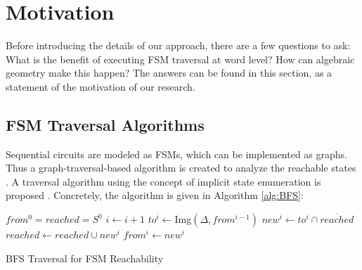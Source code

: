 \section{Motivation}
Before introducing the details of our approach, there are a few questions to ask: What is 
the benefit of executing FSM traversal at word level? How can algebraic geometry make this happen?
The answers can be found in this section, as a statement of the motivation of our research.

\subsection{FSM Traversal Algorithms}
Sequential circuits are modeled as FSMs, which can be implemented as graphs. Thus a 
graph-traversal-based algorithm is created to analyze the reachable states \cite{coudert2003unified}.
A traversal algorithm using the concept of implicit state enumeration is proposed \cite{cho1993redundancy}.
Concretely, the algorithm is given in Algorithm \ref{alg:BFS}:

% 

\begin{algorithm}[hbt]
\SetAlgoNoLine
\LinesNumbered

  $from^0 = reached = S^0$\;
  {
  	$i \gets i + 1$\;
	$to^i \gets$Img$(\Delta, from^{i-1})$\;
	$new^i \gets to^i \cap \overline{reached}$\;
  	$reached \gets reached \cup new^i$\;
	$from^i \gets new^i$\;
  }
\caption {BFS Traversal for FSM Reachability}\label{alg:BFS}
\end{algorithm}

